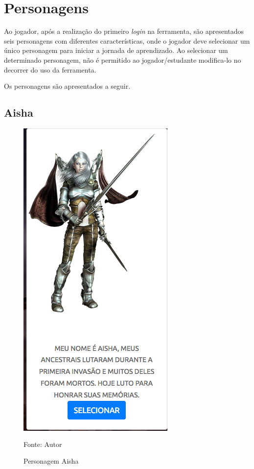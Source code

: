 \section{Personagens}

Ao jogador, após a realização do primeiro \textit{login} na ferramenta, são apresentados seis personagens com diferentes características, onde o jogador
deve selecionar um único personagem para iniciar a jornada de aprendizado. Ao selecionar um determinado personagem, não é permitido ao jogador/estudante 
modifica-lo no decorrer do uso da ferramenta.

Os personagens são apresentados a seguir.

\subsection{Aisha}
\begin{figure}[h]
	\centering
	\includegraphics[keepaspectratio=true,scale=0.5]{figuras/aisha.png}
	\caption{Personagem Aisha}
	Fonte: Autor
	\label{aisha}
\end{figure}

